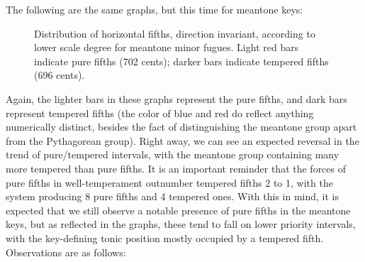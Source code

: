 The following are the same graphs, but this time for meantone keys:



\begin{figure}[H]
    \begin{center}
    \caption[Distribution of horizontal fifths, direction invariant, according to lower scale degree for meantone minor fugues. ]{Distribution of horizontal fifths, direction invariant, according to lower scale degree for meantone minor fugues. Light red bars indicate pure fifths (702 cents); darker bars indicate tempered fifths (696 cents).}
    \end{center}
\end{figure}
    
    Again, the lighter bars in these graphs represent the pure fifths, and
dark bars represent tempered fifths (the color of blue and red do
reflect anything numerically distinct, besides the fact of
distinguishing the meantone group apart from the Pythagorean group).
Right away, we can see an expected reversal in the trend of
pure/tempered intervals, with the meantone group containing many more
tempered than pure fifths. It is an important reminder that the forces
of pure fifths in well-temperament outnumber tempered fifths 2 to 1,
with the system producing 8 pure fifths and 4 tempered ones. With this
in mind, it is expected that we still observe a notable presence of pure
fifths in the meantone keys, but as reflected in the graphs, these tend
to fall on lower priority intervals, with the key-defining tonic
position mostly occupied by a tempered fifth. Observations are as
follows:

